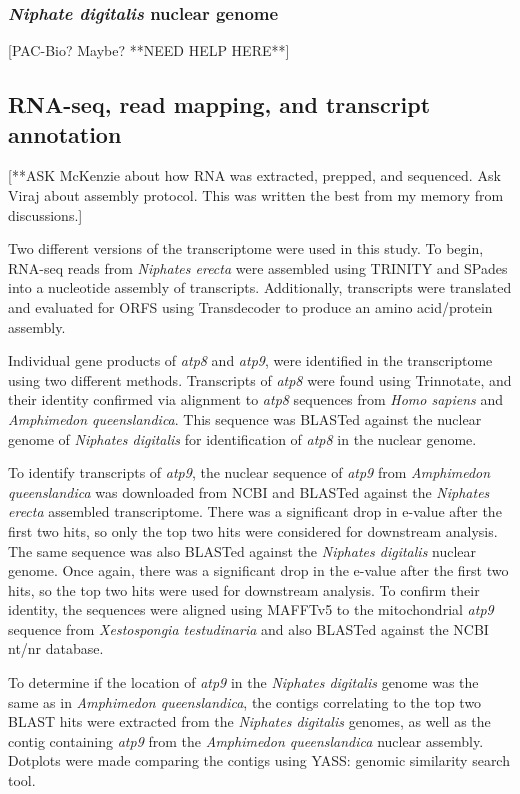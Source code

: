 \documentclass[../main.tex]{subfiles}
\begin{document}
\subsubsection{\emph{Niphate digitalis} nuclear genome}

[PAC-Bio? Maybe? **NEED HELP HERE**]

\subsection{RNA-seq, read mapping, and transcript annotation}

[**ASK McKenzie about how RNA was extracted, prepped, and sequenced. Ask Viraj about assembly protocol. This was written the best from my memory from discussions.]

Two different versions of the transcriptome were used in this study. To begin, RNA-seq reads from \emph{Niphates erecta} were assembled using TRINITY and SPades into a nucleotide assembly of transcripts. Additionally, transcripts were translated and evaluated for ORFS using Transdecoder to produce an amino acid/protein assembly. 

Individual gene products of \emph{atp8} and \emph{atp9}, were identified in the transcriptome using two different methods. Transcripts of \emph{atp8} were found using Trinnotate, and their identity confirmed via alignment to \emph{atp8} sequences from \emph{Homo sapiens} and \emph{Amphimedon queenslandica}. This sequence was BLASTed against the nuclear genome of \emph{Niphates digitalis} for identification of \emph{atp8} in the nuclear genome. 

To identify transcripts of \emph{atp9}, the nuclear sequence of \emph{atp9} from \emph{Amphimedon queenslandica} was downloaded from NCBI and BLASTed against the \emph{Niphates erecta} assembled transcriptome. There was a significant drop in e-value after the first two hits, so only the top two hits were considered for downstream analysis. The same sequence was also BLASTed against the \emph{Niphates digitalis} nuclear genome. Once again, there was a significant drop in the e-value after the first two hits, so the top two hits were used for downstream analysis. To confirm their identity, the sequences were aligned using MAFFTv5 to the mitochondrial \emph{atp9} sequence from \emph{Xestospongia testudinaria} and also BLASTed against the NCBI nt/nr database. 

To determine if the location of \emph{atp9} in the \emph{Niphates digitalis} genome was the same as in \emph{Amphimedon queenslandica}, the contigs correlating to the top two BLAST hits were extracted from the \emph{Niphates digitalis} genomes, as well as the contig containing \emph{atp9} from the \emph{Amphimedon queenslandica} nuclear assembly. Dotplots were made comparing the contigs using YASS: genomic similarity search tool. 
\end{document}
